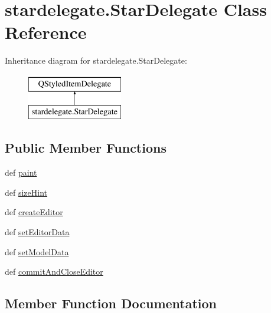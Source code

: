 \hypertarget{classstardelegate_1_1StarDelegate}{}\section{stardelegate.\+Star\+Delegate Class Reference}
\label{classstardelegate_1_1StarDelegate}
Inheritance diagram for stardelegate.\+Star\+Delegate\+:\begin{figure}[H]
\begin{center}
\leavevmode
\includegraphics[height=2.000000cm]{classstardelegate_1_1StarDelegate}
\end{center}
\end{figure}
\subsection*{Public Member Functions}
\begin{DoxyCompactItemize}
\item 
def \hyperlink{classstardelegate_1_1StarDelegate_a70519177cc25e934e59de9811b25dcfc}{paint}
\item 
def \hyperlink{classstardelegate_1_1StarDelegate_a3eafbbae690e4e48b0fe442806df6f23}{size\+Hint}
\item 
def \hyperlink{classstardelegate_1_1StarDelegate_ad58a50b2a82d3fe73a4c5cdaa1a61eeb}{create\+Editor}
\item 
def \hyperlink{classstardelegate_1_1StarDelegate_a9effbc59ae6aed1b1d30bc9dc0ee58a2}{set\+Editor\+Data}
\item 
def \hyperlink{classstardelegate_1_1StarDelegate_ad9e832144b9cd4676cf70c93baf5c45e}{set\+Model\+Data}
\item 
def \hyperlink{classstardelegate_1_1StarDelegate_a7f34cf08cab3dcbcf1b49cb4ef8e45c0}{commit\+And\+Close\+Editor}
\end{DoxyCompactItemize}


\subsection{Member Function Documentation}
\hypertarget{classstardelegate_1_1StarDelegate_a7f34cf08cab3dcbcf1b49cb4ef8e45c0}{}
